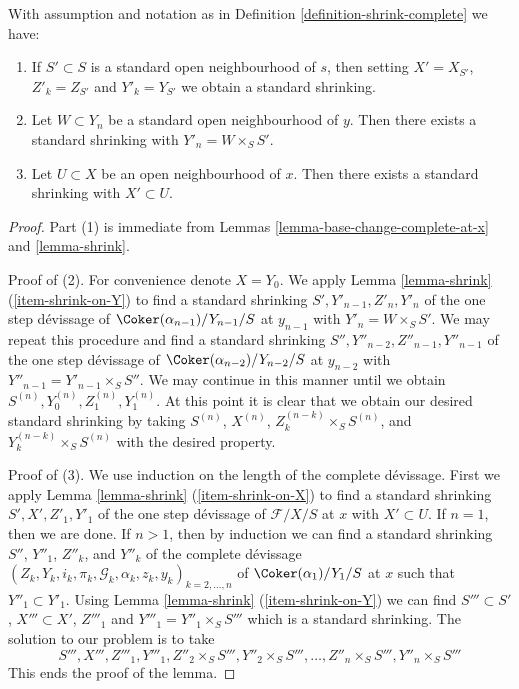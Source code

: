 \begin{lemma}
\label{lemma-shrink-complete}
With assumption and notation as in
Definition \ref{definition-shrink-complete}
we have:
\begin{enumerate}
\item
\label{item-shrink-base-complete}
If $S' \subset S$ is a standard open neighbourhood of $s$, then
setting $X' = X_{S'}$, $Z'_k = Z_{S'}$ and $Y'_k = Y_{S'}$ we obtain a
standard shrinking.
\item
\label{item-shrink-on-Y-complete}
Let $W \subset Y_n$ be a standard open neighbourhood of $y$.
Then there exists a standard shrinking with $Y'_n = W \times_S S'$.
\item
\label{item-shrink-on-X-complete}
Let $U \subset X$ be an open neighbourhood of $x$.
Then there exists a standard shrinking with $X' \subset U$.
\end{enumerate}
\end{lemma}

\begin{proof}
Part (1) is immediate from
Lemmas \ref{lemma-base-change-complete-at-x} and
\ref{lemma-shrink}.

\medskip\noindent
Proof of (2). For convenience denote $X = Y_0$. We apply
Lemma \ref{lemma-shrink} (\ref{item-shrink-on-Y})
to find a standard shrinking
$S', Y'_{n - 1}, Z'_n, Y'_n$
of the one step d\'evissage of $\Coker(\alpha_{n - 1})/Y_{n - 1}/S$
at $y_{n - 1}$ with $Y'_n = W \times_S S'$. We may repeat this procedure
and find a standard shrinking
$S'', Y''_{n - 2}, Z''_{n - 1}, Y''_{n - 1}$
of the one step d\'evissage of $\Coker(\alpha_{n - 2})/Y_{n - 2}/S$
at $y_{n - 2}$ with $Y''_{n - 1} = Y'_{n - 1} \times_S S''$.
We may continue in this manner until we obtain
$S^{(n)}, Y^{(n)}_0, Z^{(n)}_1, Y^{(n)}_1$.
At this point it is clear that we obtain our desired standard shrinking
by taking $S^{(n)}$, $X^{(n)}$, $Z_k^{(n - k)} \times_S S^{(n)}$, and
$Y_k^{(n - k)} \times_S S^{(n)}$ with the desired property.

\medskip\noindent
Proof of (3). We use induction on the length of the complete
d\'evissage. First we apply
Lemma \ref{lemma-shrink} (\ref{item-shrink-on-X})
to find a standard shrinking
$S', X', Z'_1, Y'_1$
of the one step d\'evissage of $\mathcal{F}/X/S$ at $x$
with $X' \subset U$. If $n = 1$, then we are done.
If $n > 1$, then by induction we can find a standard shrinking
$S''$, $Y''_1$, $Z''_k$, and $Y''_k$ of the complete d\'evissage
$(Z_k, Y_k, i_k, \pi_k, \mathcal{G}_k, \alpha_k, z_k, y_k)_{k = 2, \ldots, n}$
of $\Coker(\alpha_1)/Y_1/S$ at $x$ such that
$Y''_1 \subset Y'_1$. Using
Lemma \ref{lemma-shrink} (\ref{item-shrink-on-Y})
we can find $S''' \subset S'$, $X''' \subset X'$, $Z'''_1$ and
$Y'''_1 = Y''_1 \times_S S'''$ which is a standard shrinking.
The solution to our problem is to take
$$
S''', X''', Z'''_1, Y'''_1, Z''_2 \times_S S''',
Y''_2 \times_S S''', \ldots, Z''_n \times_S S''', Y''_n \times_S S'''
$$
This ends the proof of the lemma.
\end{proof}
